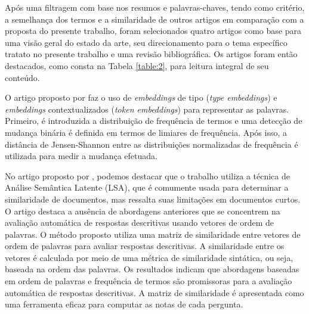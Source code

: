 
Após uma filtragem com base nos resumos e palavras-chaves, tendo como critério, a semelhança dos termos e a similaridade de outros artigos em comparação com a proposta do presente trabalho, foram selecionados quatro artigos como base para uma visão geral do estado da arte, seu direcionamento para o tema específico tratato no presente trabalho e uma revisão bibliográfica. Os artigos foram então destacados, como consta na Tabela \ref{table:2}, para leitura integral de seu conteúdo.

\begin{table}[htb!]
\caption{Tabela do funil de leitura.}
\label{table:2}
\end{table}

\newpage

O artigo proposto por \textcite{UnsupervisedLexicalSemanticChangeDetection} faz o uso de \textit{embeddings} de tipo (\textit{type embeddings}) e \textit{embeddings} contextualizados (\textit{token embeddings}) para representar as palavras. Primeiro, é introduzida a distribuição de frequência de termos e uma detecção de mudança binária é definida em termos de limiares de frequência. Após isso, a distância de Jensen-Shannon entre as distribuições normalizadas de frequência é utilizada para medir a mudança efetuada.

No artigo proposto por \textcite{SyntacticSimilarityBasedSimilarityMatrixForEvaluatingDescriptiveAnswer}, podemos destacar que o trabalho utiliza a técnica de Análise Semântica Latente (LSA), que é comumente usada para determinar a similaridade de documentos, mas ressalta suas limitações em documentos curtos. O artigo destaca a ausência de abordagens anteriores que se concentrem na avaliação automática de respostas descritivas usando vetores de ordem de palavras. O método proposto utiliza uma matriz de similaridade entre vetores de ordem de palavras para avaliar respostas descritivas. A similaridade entre os vetores é calculada por meio de uma métrica de similaridade sintática, ou seja, baseada na ordem das palavras. Os resultados indicam que abordagens baseadas em ordem de palavras e frequência de termos são promissoras para a avaliação automática de respostas descritivas. A matriz de similaridade é apresentada como uma ferramenta eficaz para computar as notas de cada pergunta.

